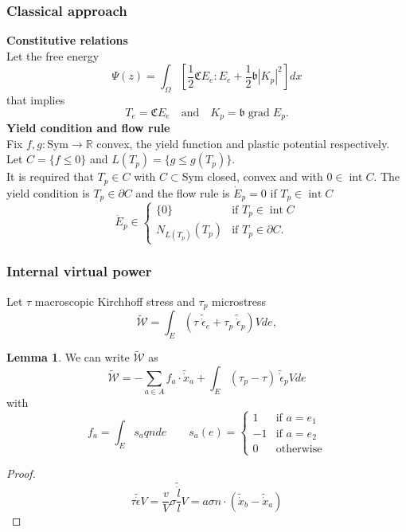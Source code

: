 \documentclass[8pt]{beamer}
\numberwithin{equation}{section}
\theoremstyle{definition}
\newtheorem{lem}[prop]{Lemma}
\DeclareMathOperator{\grad}{grad}
\DeclareMathOperator{\inter}{int}
\begin{document}
\begin{frame}
\frametitle{Classical approach}
\centering
\begin{minipage}[c]{0.6\textwidth}
\textbf{Constitutive relations}
\\[0.5ex]
Let the free energy
\[
\Psi(z)=\int_\Omega\left[\frac{1}{2}\mathfrak{C}E_e:E_e+\frac{1}{2}\mathfrak{b}|K_p|^2\right]dx
\]
that implies
\[
T_e=\mathfrak{C}E_e\quad\text{and}\quad K_p=\mathfrak{b}\grad E_p.
\]
\textbf{Yield condition and flow rule}
\\[0.5em]
Fix $f,g\colon\text{Sym}\to\mathbb{R}$ convex, the yield function and plastic potential respectively. Let $C=\{f\le0\}$ and $L(T_p)=\{g\le g(T_p)\}$.
\\[0.5em]
It is required that $T_p\in C$ with $C\subset\text{Sym}$ closed, convex and with $0\in\inter C$. The yield condition is $T_p\in\partial C$ and the flow rule is $\dot E_p=0$ if $T_p\in\inter C$
\[
\dot E_p\in
\begin{cases}
\{0\} & \text{if $T_p\in\inter C$} \\
N_{L(T_p)}(T_p) & \text{if $T_p\in\partial C$}.
\end{cases}
\]
\end{minipage}
\hspace{0.02\textwidth}
\begin{minipage}[c]{0.35\textwidth}
\begin{center}
\end{center}
\end{minipage}
\end{frame}

\begin{frame}
\frametitle{Internal virtual power}

Let $\tau$ macroscopic Kirchhoff stress and $\tau_p$ microstress
\[
\tilde{\mathcal{W}}=\int_E\left(\tau\;\tilde{\dot\epsilon}_e+\tau_p\;\tilde{\dot\epsilon}_p \right)Vde,
\]

\begin{lem}
We can write $\tilde{\mathcal{W}}$ as
\[
\tilde{\mathcal{W}}=-\sum_{a\in A}f_a\cdot\tilde{\dot x}_a+\int_E(\tau_p-\tau)\;\tilde{\dot\epsilon}_pVde
\]
with
\[
f_a=\int_Es_aqnde\qquad s_a(e)=
\begin{cases}
1 & \text{if $a=e_1$} \\
-1 & \text{if $a=e_2$} \\
0 & \text{otherwise}
\end{cases}
\]
\end{lem}
\begin{proof}
\[
\tau\tilde{\dot\epsilon}V=\frac{v}{V}\sigma\frac{\tilde{\dot l}}{l}V=a\sigma n\cdot\left(\tilde{\dot x}_b-\tilde{\dot x}_a\right)
\]
\end{proof}
\end{frame}
\end{document}
